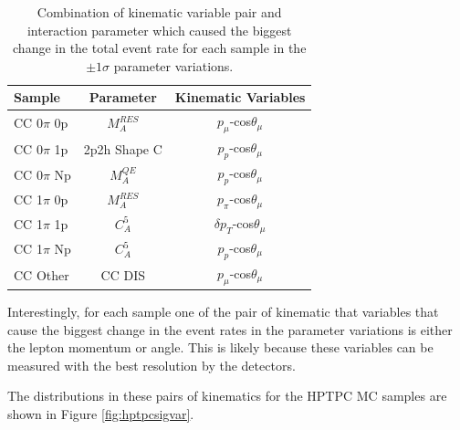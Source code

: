 \begin{center}
\begin{table}
\center
\begin{tabular}{l ||c c}
\hline \hline
\textbf{Sample} & \textbf{Parameter} & \textbf{Kinematic Variables} \\
 \hline \hline
CC 0$\pi$ 0p & $M_{A}^{RES}$ & $p_{\mu}$-cos$\theta_{\mu}$\\
CC 0$\pi$ 1p & 2p2h Shape C & $p_{p}$-cos$\theta_{\mu}$\\
CC 0$\pi$ Np & $M_{A}^{QE}$ & $p_{p}$-cos$\theta_{\mu}$\\
CC 1$\pi$ 0p & $M_{A}^{RES}$ & $p_{\pi}$-cos$\theta_{\mu}$\\
CC 1$\pi$ 1p & $C_{A}^{5}$ & $\delta p_{T}$-cos$\theta_{\mu}$\\
CC 1$\pi$ Np & $C_{A}^{5}$ & $p_{p}$-cos$\theta_{\mu}$\\
CC Other & CC DIS & $p_{\mu}$-cos$\theta_{\mu}$\\
\hline \hline
\end{tabular}
\caption{Combination of kinematic variable pair and interaction parameter which caused the biggest change in the total event rate for each sample in the $\pm1\sigma$ parameter variations.}
\label{tab:hptpcsigvar}
\end{table}
\end{center}

Interestingly, for each sample one of the pair of kinematic that  variables that cause the biggest change in the event rates in the parameter variations is either the lepton momentum or angle. This is likely because these variables can be measured with the best resolution by the detectors.

The distributions in these pairs of kinematics for the HPTPC MC samples are shown in Figure \ref{fig:hptpcsigvar}.

